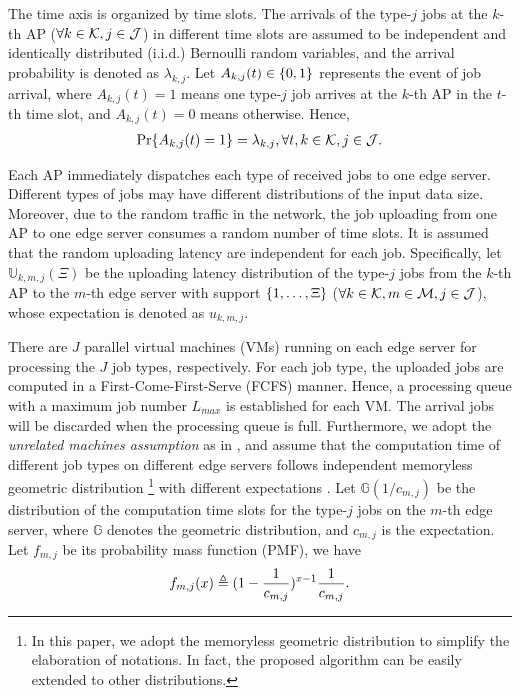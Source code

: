 The time axis is organized by time slots.
The arrivals of the type-$j$ jobs at the $k$-th AP ($\forall k\in\mathcal{K},j\in\mathcal{J}$) in different time slots are assumed to be independent and identically distributed (i.i.d.) Bernoulli random variables, and the arrival probability is denoted as $\lambda_{k,j}$.
Let $A_{k,j}(t) \in \{0,1\}$ represents the event of job arrival, where $A_{k,j}(t)=1$ means one type-$j$ job arrives at the $k$-th AP in the $t$-th time slot, and $A_{k,j}(t)=0$ means otherwise.
Hence,
\begin{align}
    \Pr\{ A_{k,j}(t) = 1 \} = \lambda_{k,j}, \forall t,k\in\mathcal{K},j\in\mathcal{J}.
\end{align}

Each AP immediately dispatches each type of received jobs to one edge server.
Different types of jobs may have different distributions of the input data size.
Moreover, due to the random traffic in the network, the job uploading from one AP to one edge server consumes a random number of time slots.
It is assumed that the random uploading latency are independent for each job.
Specifically, let $\mathbb{U}_{k,m,j}(\Xi)$ be the uploading latency distribution of the type-$j$ jobs from the $k$-th AP to the $m$-th edge server with support $\{1, \dots, \Xi\}$ ($\forall k\in\mathcal{K}, m\in\mathcal{M}, j\in\mathcal{J}$), whose expectation is denoted as $u_{k,m,j}$.

There are $J$ parallel virtual machines (VMs) running on each edge server for processing the $J$ job types, respectively.
For each job type, the uploaded jobs are computed in a First-Come-First-Serve (FCFS) manner.
Hence, a processing queue with a maximum job number $L_{max}$ is established for each VM.
The arrival jobs will be discarded when the processing queue is full.
Furthermore, we adopt the \emph{unrelated machines assumption} as in \cite{tan-online}, and assume that the computation time of different job types on different edge servers follows independent memoryless geometric distribution 
\footnote{In this paper, we adopt the memoryless geometric distribution to simplify the elaboration of notations. In fact, the proposed algorithm can be easily extended to other distributions.}
with different expectations \cite{TOWC18-HuangKb}.
Let $\mathbb{G}(1/c_{m,j})$ be the distribution of the computation time slots for the type-$j$ jobs on the $m$-th edge server, where $\mathbb{G}$ denotes the geometric distribution, and $c_{m,j}$ is the expectation.
Let $f_{m,j}$ be its probability mass function (PMF), we have
\begin{align}
    f_{m,j}(x) \triangleq (1-\frac{1}{c_{m,j}})^{x-1} \frac{1}{c_{m,j}}.
\end{align}

